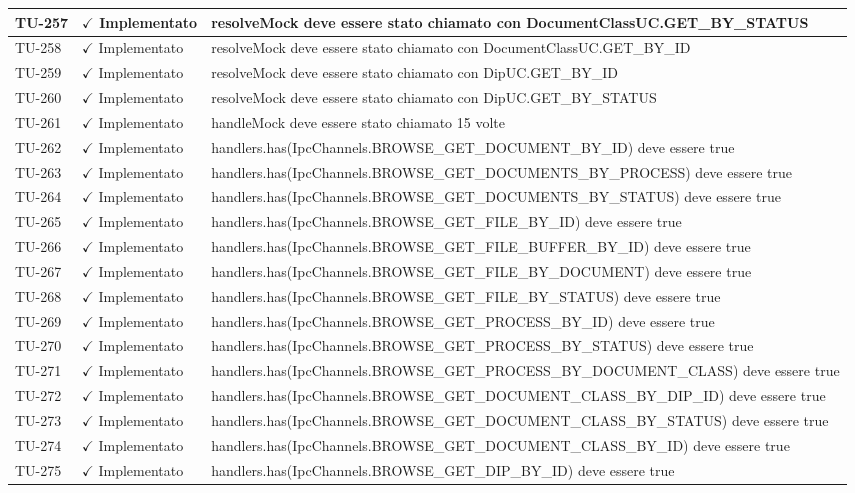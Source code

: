 ﻿\documentclass[a4paper,12pt]{article}
\newcommand{\ok}{\textcolor{green!60!black}{$\checkmark$ Implementato}}
\begin{document}
\begin{longtable}{|p{2cm}|p{3.5cm}|p{9.5cm}|}
\hline
TU-257 & \ok & resolveMock deve essere stato chiamato con DocumentClassUC.GET\_BY\_STATUS \\
\hline
TU-258 & \ok & resolveMock deve essere stato chiamato con DocumentClassUC.GET\_BY\_ID \\
\hline
TU-259 & \ok & resolveMock deve essere stato chiamato con DipUC.GET\_BY\_ID \\
\hline
TU-260 & \ok & resolveMock deve essere stato chiamato con DipUC.GET\_BY\_STATUS \\
\hline
TU-261 & \ok & handleMock deve essere stato chiamato 15 volte \\
\hline
TU-262 & \ok & handlers.has(IpcChannels.BROWSE\_GET\_DOCUMENT\_BY\_ID) deve essere true \\
\hline
TU-263 & \ok & handlers.has(IpcChannels.BROWSE\_GET\_DOCUMENTS\_BY\_PROCESS) deve essere true \\
\hline
TU-264 & \ok & handlers.has(IpcChannels.BROWSE\_GET\_DOCUMENTS\_BY\_STATUS) deve essere true \\
\hline
TU-265 & \ok & handlers.has(IpcChannels.BROWSE\_GET\_FILE\_BY\_ID) deve essere true \\
\hline
TU-266 & \ok & handlers.has(IpcChannels.BROWSE\_GET\_FILE\_BUFFER\_BY\_ID) deve essere true \\
\hline
TU-267 & \ok & handlers.has(IpcChannels.BROWSE\_GET\_FILE\_BY\_DOCUMENT) deve essere true \\
\hline
TU-268 & \ok & handlers.has(IpcChannels.BROWSE\_GET\_FILE\_BY\_STATUS) deve essere true \\
\hline
TU-269 & \ok & handlers.has(IpcChannels.BROWSE\_GET\_PROCESS\_BY\_ID) deve essere true \\
\hline
TU-270 & \ok & handlers.has(IpcChannels.BROWSE\_GET\_PROCESS\_BY\_STATUS) deve essere true \\
\hline
TU-271 & \ok & handlers.has(IpcChannels.BROWSE\_GET\_PROCESS\_BY\_DOCUMENT\_CLASS) deve essere true \\
\hline
TU-272 & \ok & handlers.has(IpcChannels.BROWSE\_GET\_DOCUMENT\_CLASS\_BY\_DIP\_ID) deve essere true \\
\hline
TU-273 & \ok & handlers.has(IpcChannels.BROWSE\_GET\_DOCUMENT\_CLASS\_BY\_STATUS) deve essere true \\
\hline
TU-274 & \ok & handlers.has(IpcChannels.BROWSE\_GET\_DOCUMENT\_CLASS\_BY\_ID) deve essere true \\
\hline
TU-275 & \ok & handlers.has(IpcChannels.BROWSE\_GET\_DIP\_BY\_ID) deve essere true \\

\end{longtable}
\end{document}
